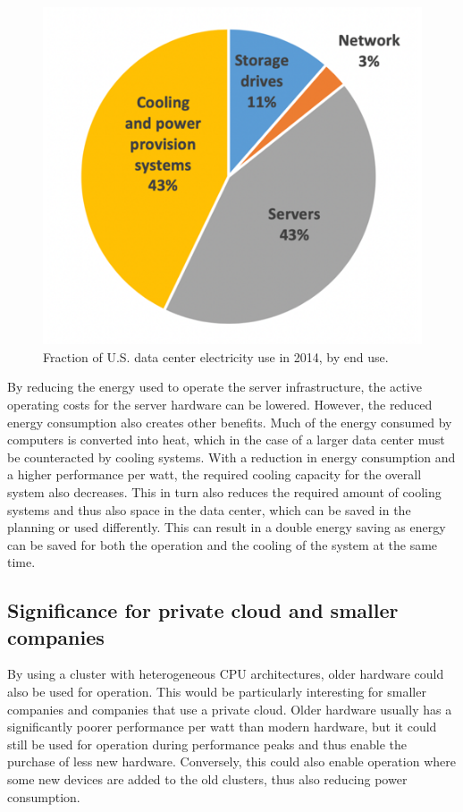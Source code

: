 \begin{figure}[h]
	\centering
	\includegraphics[width=.75\linewidth]{fig/electricityUseDatacenter2014.png}
	\caption{Fraction of U.S. data center electricity use in 2014, by end use. \cite{shehabi2016united}}
	\label{fig:electricityUseDatacenter2014}	
\end{figure}

By reducing the energy used to operate the server infrastructure, the active
operating costs for the server hardware can be lowered. However, the reduced
energy consumption also creates other benefits. Much of the energy consumed by
computers is converted into heat, which in the case of a larger data center
must be counteracted by cooling systems. With a reduction in energy consumption
and a higher performance per watt, the required cooling capacity for the
overall system also decreases. This in turn also reduces the required amount of
cooling systems and thus also space in the data center, which can be saved in
the planning or used differently. This can result in a double energy saving as
energy can be saved for both the operation and the cooling of the system at the
same time.

\subsection{Significance for private cloud and smaller companies}
By using a cluster with heterogeneous CPU architectures, older hardware could
also be used for operation. This would be particularly interesting for smaller
companies and companies that use a private cloud. Older hardware usually has a
significantly poorer performance per watt than modern hardware, but it could
still be used for operation during performance peaks and thus enable the
purchase of less new hardware.  Conversely, this could also enable operation
where some new devices are added to the old clusters, thus also reducing power
consumption.

